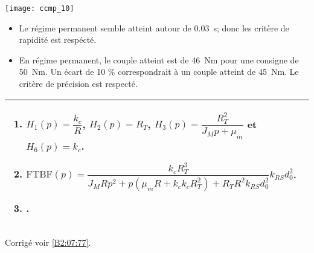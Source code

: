 \ifprof
\else
\begin{center}
\texttt{[image: ccmp\_10]}
\end{center}
\fi

\ifprof
\begin{corrige}
\begin{itemize}
\item Le régime permanent semble atteint autour de \SI{0,03}{s}; donc les critère de rapidité est respécté.
\item En régime permanent, le couple atteint est de \SI{46}{Nm} pour une consigne de \SI{50}{Nm}. Un écart de 10 \% correspondrait à un couple atteint de \SI{45}{Nm}. Le critère de précision est respecté.
\end{itemize}
\end{corrige}
\else
\fi




\ifprof
\else

\ifcolle
\else
\noindent
\begin{tabular}{|p{.95\linewidth}|}
\hline
\begin{enumerate}
\item  $H_1(p)=\dfrac{k_c}{R}$, $H_2(p)=R_T$,  $H_3(p) = \dfrac{R_T^2}{J_M p  + \mu_m }$ et   $H_6(p)={k_c}$.
\item $\text{FTBF}(p)= \dfrac{k_c R_T^3}{J_MR p^2  + p\left(\mu_m R  +k_ck_c R_T^2\right)+R_TR^2k_{RS}d_0^2}k_{RS}d_0^2 $.
\item .
\end{enumerate} \\
\hline
\end{tabular}
\fi
\begin{flushright}
\footnotesize{Corrigé  voir \ref{B2:07:77}.}
\end{flushright}%
\fi